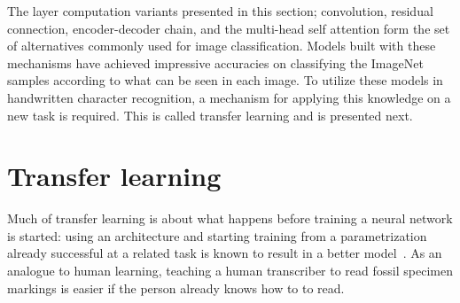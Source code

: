 \documentclass[english,twoside,openright]{UH_DS_MSc}
\begin{document}
The layer computation variants presented in this section; convolution, residual connection, encoder-decoder chain, and 
the multi-head self attention form the set of alternatives commonly used for image classification. Models built with these mechanisms 
have achieved impressive accuracies on classifying the ImageNet samples according to what can be seen in each image.
To utilize these models in handwritten character recognition, a mechanism for applying this knowledge on a new task is required.
This is called transfer learning and is presented next.

\section{Transfer learning}
\label{sect:transfer_learning}

Much of transfer learning is about what happens before training a neural network is started: using an architecture and starting training from a parametrization already successful at a related task
is known to result in a better model~\cite{transferlearning_survey}. As an analogue to human learning, teaching a human transcriber to read fossil specimen markings is easier if the person already knows how to to read.
\end{document}
